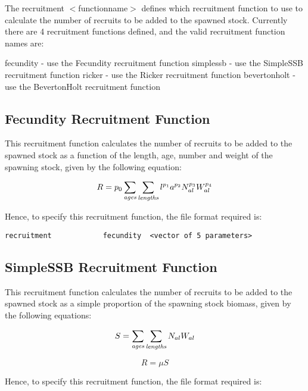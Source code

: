 \documentclass[10pt,twoside]{book}
\begin{document}
The recruitment $<$functionname$>$ defines which recruitment function to use to calculate the number of recruits to be added to the spawned stock.  Currently there are 4 recruitment functions defined, and the valid recruitment function names are:

\bigskip
fecundity - use the Fecundity recruitment function\newline
simplessb - use the SimpleSSB recruitment function\newline
ricker - use the Ricker recruitment function\newline
bevertonholt - use the BevertonHolt recruitment function

\subsection{Fecundity Recruitment Function}
This recruitment function calculates the number of recruits to be added to the spawned stock as a function of the length, age, number and weight of the spawning stock, given by the following equation:

\begin{equation}\label{eq:rec1}
R = p_{0} \sum_{\it ages}\sum_{\it lengths} l ^{p_{1}} a ^{p_{2}} N_{al} ^{p_{3}} W_{al} ^{p_{4}}
\end{equation}

Hence, to specify this recruitment function, the file format required is:

{\small\begin{verbatim}
recruitment            fecundity  <vector of 5 parameters>
\end{verbatim}}

\subsection{SimpleSSB Recruitment Function}
This recruitment function calculates the number of recruits to be added to the spawned stock as a simple proportion of the spawning stock biomass, given by the following equations:

\begin{equation}\label{eq:ssb}
S = \sum_{\it ages}\sum_{\it lengths} N_{al} W_{al}
\end{equation}

\begin{equation}\label{eq:rec2}
R = \mu S
\end{equation}

Hence, to specify this recruitment function, the file format required is:
\end{document}
